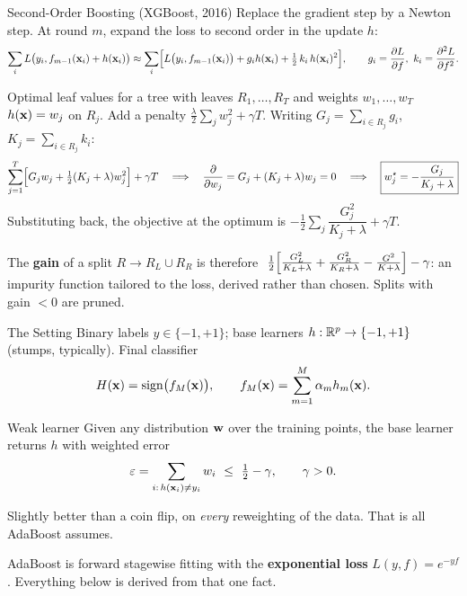 \documentclass[11pt,aspectratio=169]{beamer}
\begin{document}
\begin{frame}{Second-Order Boosting (XGBoost, 2016)}\footnotesize
Replace the gradient step by a Newton step. At round $m$, expand the loss to second order in the update $h$:
\[
\sum_iL\bigl(y_i,f_{m-1}(\vx_i)+h(\vx_i)\bigr)\approx\sum_i\Bigl[L\bigl(y_i,f_{m-1}(\vx_i)\bigr)+g_ih(\vx_i)+\tfrac12\,k_i\,h(\vx_i)^2\Bigr],
\qquad g_i=\frac{\partial L}{\partial f},\ k_i=\frac{\partial^2L}{\partial f^2}.
\]
\begin{derivation}{Optimal leaf values for a tree with leaves $R_1,\dots,R_T$ and weights $w_1,\dots,w_T$}
$h(\mathbf{x})=w_j$ on $R_j$. Add a penalty $\frac\lambda2\sum_jw_j^2+\gamma T$. Writing $G_j=\sum_{i\in R_j}g_i$, $K_j=\sum_{i\in R_j}k_i$:
\[
\sum_{j=1}^T\Bigl[G_jw_j+\tfrac12(K_j+\lambda)w_j^2\Bigr]+\gamma T
\quad\Longrightarrow\quad
\frac{\partial}{\partial w_j}=G_j+(K_j+\lambda)w_j=0
\quad\Longrightarrow\quad
\boxed{w_j^\star=-\frac{G_j}{K_j+\lambda}}
\]
Substituting back, the objective at the optimum is $-\tfrac12\sum_j\dfrac{G_j^2}{K_j+\lambda}+\gamma T$.
\end{derivation}
\begin{keypoint}
The \textbf{gain} of a split $R\to R_L\cup R_R$ is therefore
$\ \tfrac12\Bigl[\tfrac{G_L^2}{K_L+\lambda}+\tfrac{G_R^2}{K_R+\lambda}-\tfrac{G^2}{K+\lambda}\Bigr]-\gamma$:
an impurity function tailored to the loss, derived rather than chosen. Splits with gain $<0$ are pruned.
\end{keypoint}
\end{frame}


\begin{frame}{The Setting}
Binary labels $y\in\{-1,+1\}$; base learners $h:\mathbb{R}^p\to\{-1,+1\}$ (stumps, typically). Final classifier
\[
H(\mathbf{x})=\operatorname{sign}\bigl(f_M(\mathbf{x})\bigr),\qquad f_M(\mathbf{x})=\sum_{m=1}^M\alpha_mh_m(\mathbf{x}).
\]
\begin{block}{Weak learner}
Given any distribution $\mathbf{w}$ over the training points, the base learner returns $h$ with weighted error
\[
\varepsilon=\sum_{i:\,h(\vx_i)\ne y_i}w_i\ \le\ \tfrac12-\gamma,\qquad\gamma>0 .
\]
\end{block}
Slightly better than a coin flip, on \emph{every} reweighting of the data. That is all AdaBoost assumes.
\vspace{6pt}

AdaBoost is forward stagewise fitting with the \textbf{exponential loss} $L(y,f)=e^{-yf}$. Everything below
is derived from that one fact.
\end{frame}
\end{document}
